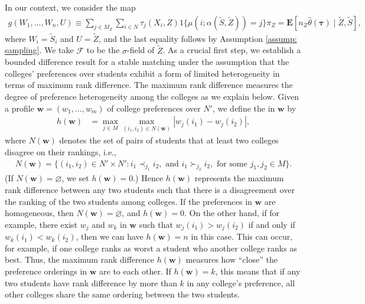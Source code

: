 \documentclass[12pt, fullpage]{amsart}
\theoremstyle{definition}
\theoremstyle{definition}
\theoremstyle{definition}
\begin{document}
\begin{bibunit}[econometrica]
In our context, we consider the map
\begin{align}
	\label{emp mat prob}
	g(W_1,...,W_n, U) \equiv \sum_{j \in M_Z} \sum_{i \in N} \tau_{j}\left( X_i, Z \right) 1\{ \mu(i;\alpha(\tilde S,\tilde Z)) = j\} \pi_Z = \mathbf{E}\left[n_Z \hat \theta(\boldsymbol{\tau}) \mid \tilde Z, \tilde S \right],
\end{align}
where $W_i = \tilde S_i$ and $U = \tilde Z$, and the last equality follows by Assumption \ref{assump: sampling}. We take $\mathcal{F}$ to be the $\sigma$-field of $\tilde{Z}$. As a crucial first step, we establish a bounded difference result for a stable matching under the assumption that the colleges' preferences over students exhibit a form of limited heterogeneity in terms of maximum rank difference. The maximum rank difference measures the degree of preference heterogeneity among the colleges as we explain below. Given a profile $\boldsymbol{w} = (w_1,...,w_m)$ of college preferences over $N'$, we define the  in $\boldsymbol{w}$ by
\begin{align}
	\label{h(w)}
	h(\boldsymbol{w}) & = \max_{j \in M} \max_{(i_{1},i_{2})\in N(\boldsymbol{w})}|w_j(i_{1})-w_j(i_{2})|,
\end{align}
where $N(\boldsymbol{w})$ denotes the set of pairs of students that at least two colleges disagree on their rankings, i.e., 
\begin{align*}
	N(\boldsymbol{w}) = \{(i_1,i_2) \in N' \times N': i_1 \prec_{j_1} i_2, \text{ and } i_1 \succ_{j_2} i_2, \text{ for some } j_1,j_2 \in M \}. 
\end{align*}
(If $N(\boldsymbol{w}) = \varnothing$, we set $h(\boldsymbol{w})= 0$.) Hence $h(\boldsymbol{w})$ represents the maximum rank difference between any two students such that there is a disagreement over the ranking of the two students among colleges. If the preferences in $\boldsymbol{w}$ are homogeneous, then $N(\boldsymbol{w}) = \varnothing$, and $h(\boldsymbol{w}) = 0$. On the other hand, if for example, there exist $w_j$ and $w_k$ in $\boldsymbol{w}$ such that $w_j(i_1) > w_j(i_2)$ if and only if $w_k(i_1)<w_k(i_2)$, then we can have $h(\boldsymbol{w}) = n$ in this case. This can occur, for example, if one college ranks as worst a student who another college ranks as best. Thus, the maximum rank difference $h(\boldsymbol{w})$ measures how ``close'' the preference orderings in $\boldsymbol{w}$ are to each other. If $h(\boldsymbol{w}) = k$, this means that if any two students have rank difference by more than $k$ in any college's preference, all other colleges share the same ordering between the two students. 


\end{bibunit}
\end{document}
